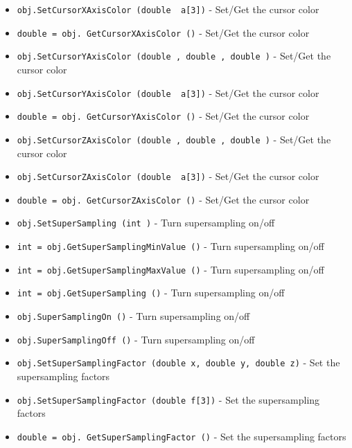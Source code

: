 \begin{itemize}
\item  \verb|obj.SetCursorXAxisColor (double  a[3])| -  Set/Get the cursor color

\item  \verb|double = obj. GetCursorXAxisColor ()| -  Set/Get the cursor color

\item  \verb|obj.SetCursorYAxisColor (double , double , double )| -  Set/Get the cursor color

\item  \verb|obj.SetCursorYAxisColor (double  a[3])| -  Set/Get the cursor color

\item  \verb|double = obj. GetCursorYAxisColor ()| -  Set/Get the cursor color

\item  \verb|obj.SetCursorZAxisColor (double , double , double )| -  Set/Get the cursor color

\item  \verb|obj.SetCursorZAxisColor (double  a[3])| -  Set/Get the cursor color

\item  \verb|double = obj. GetCursorZAxisColor ()| -  Set/Get the cursor color

\item  \verb|obj.SetSuperSampling (int )| -  Turn supersampling on/off

\item  \verb|int = obj.GetSuperSamplingMinValue ()| -  Turn supersampling on/off

\item  \verb|int = obj.GetSuperSamplingMaxValue ()| -  Turn supersampling on/off

\item  \verb|int = obj.GetSuperSampling ()| -  Turn supersampling on/off

\item  \verb|obj.SuperSamplingOn ()| -  Turn supersampling on/off

\item  \verb|obj.SuperSamplingOff ()| -  Turn supersampling on/off

\item  \verb|obj.SetSuperSamplingFactor (double x, double y, double z)| -  Set the supersampling factors

\item  \verb|obj.SetSuperSamplingFactor (double f[3])| -  Set the supersampling factors

\item  \verb|double = obj. GetSuperSamplingFactor ()| -  Set the supersampling factors


\end{itemize}
